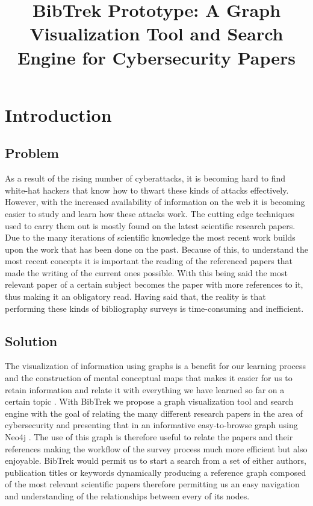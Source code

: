\documentclass[twocolumn]{article}
\begin{document}
\title{\textbf{BibTrek Prototype: A Graph Visualization Tool and Search Engine for Cybersecurity Papers}}
\date{}
\maketitle
\section{Introduction}
\subsection{Problem}
As a result of the rising number of cyberattacks, it is becoming hard to find white-hat hackers that know how to thwart these kinds of attacks effectively. However, with the increased availability of information on the web it is becoming easier to study and learn how these attacks work. The cutting edge techniques used to carry them out is mostly found on the latest scientific research papers. Due to the many iterations of scientific knowledge the most recent work builds upon the work that has been done on the past. Because of this, to understand the most recent concepts it is important the reading of the referenced papers that made the writing of the current ones possible. With this being said the most relevant paper of a certain subject becomes the paper with more references to it, thus making it an obligatory read. Having said that, the reality is that performing these kinds of bibliography surveys is time-consuming and inefficient.

\subsection{Solution}
The visualization of information using graphs is a benefit for our learning process and the construction of mental conceptual maps that makes it easier for us to retain information and relate it with everything we have learned so far on a certain topic \cite{enhancinglearningwithvisualizationtechniques}. With BibTrek we propose a graph visualization tool and search engine with the goal of relating the many different research papers in the area of cybersecurity and presenting that in an informative easy-to-browse graph using Neo4j \cite{neo4j}. The use of this graph is therefore useful to relate the papers and their references making the workflow of the survey process much more efficient but also enjoyable. BibTrek would permit us to start a search from a set of either authors, publication titles or keywords dynamically producing a reference graph composed of the most relevant scientific papers therefore permitting us an easy navigation and understanding of the relationships between every of its nodes.
\end{document}
